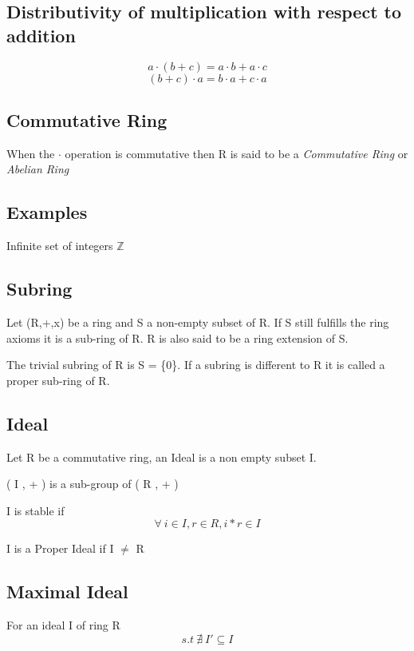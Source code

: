 \documentclass[10pt,a4paper]{report}
\begin{document}
\subsection*{Distributivity of multiplication with respect to addition}
\begin{equation}
	a \cdot (b + c) = a \cdot b + a \cdot c
\end{equation}
\begin{equation}
	(b + c) \cdot a = b \cdot a + c \cdot a 
\end{equation}
\subsection{Commutative Ring}
When the $\cdot$ operation is commutative then R is said to be a \textit{Commutative Ring} or \textit{Abelian Ring}
\subsection{Examples}

Infinite set of integers $\mathbb{Z}$

\subsection{Subring}

Let (R,+,x) be a ring and S a non-empty subset of R. If S still fulfills the ring axioms it is a sub-ring of R. R is also said to be a ring extension of S.

The trivial subring of R is S = \{0\}. If a subring is different to R it is called a proper sub-ring of R.

\subsection{Ideal}

Let R be a commutative ring, an Ideal is a non empty subset I.

( I , + ) is a sub-group of ( R , + )

I is stable if
\begin{equation}
	\forall\ i \in I, r \in R, i * r \in I
\end{equation}

I is a Proper Ideal if I $\neq$ R

\subsection*{Maximal Ideal}
For an ideal I of ring R
\begin{equation}
	s.t\ \nexists\ I' \subseteq I
\end{equation}
\end{document}
